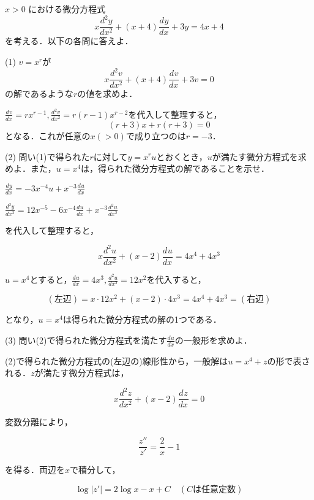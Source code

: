 \documentclass[a4j]{jarticle}
\let \ds \displaystyle
\newcommand{\idiff}[3]{
  \frac{d^{#1} #2}{d #3^{#1}}
}
\begin{document}
\section{}

\begin{screen}
 $x>0$ における微分方程式
 $$x\idiff{2}{y}{x}+(x+4)\idiff{}{y}{x}+3y = 4x+4$$
 を考える．以下の各問に答えよ．
\end{screen}

\begin{screen}
 (1) $v=x^r$が
 $$x\idiff{2}{v}{x}+(x+4)\idiff{}{v}{x}+3v=0$$
 の解であるような$r$の値を求めよ．
\end{screen}

$\ds \idiff{}{v}{x}=rx^{r-1},\idiff{2}{v}{x}=r(r-1)x^{r-2}$を代入して整理すると，
$$(r+3)x+r(r+3)=0$$となる．これが任意の$x(>0)$で成り立つのは$r=-3$．

\begin{screen}
 (2) 問い(1)で得られた$r$に対して$y=x^ru$とおくとき，$u$が満たす微分方程式を求めよ．また，$u=x^4$は，得られた微分方程式の解であることを示せ．
\end{screen}

$ \ds \idiff{}{y}{x}=-3x^{-4}u + x^{-3}\idiff{}{u}{x} $

$\ds \idiff{2}{y}{x}=12x^{-5}-6x^{-4}\idiff{}{u}{x}+x^{-3}\idiff{2}{u}{x} $

を代入して整理すると，

$$x\idiff{2}{u}{x}+(x-2)\idiff{}{u}{x}=4x^4+4x^3$$

$u=x^4$とすると，$\ds \idiff{}{u}{x}=4x^3,\idiff{2}{u}{x}=12x^2$を代入すると，

$$(\mbox{左辺})=x\cdot 12x^2 +(x-2)\cdot 4x^3= 4x^4+4x^3 = (\mbox{右辺})$$

となり，$u=x^4$は得られた微分方程式の解の1つである．

\begin{screen}
 (3) 問い(2)で得られた微分方程式を満たす$\ds \idiff{}{u}{x}$の一般形を求めよ．
\end{screen}

(2)で得られた微分方程式の(左辺の)線形性から，一般解は$u=x^4+z$の形で表される．$z$が満たす微分方程式は，

$$x\idiff{2}{z}{x}+(x-2)\idiff{}{z}{x}=0$$

変数分離により，

$$\frac{z''}{z'}=\frac{2}{x}-1$$

を得る．両辺を$x$で積分して，

$$\log |z'| = 2\log x - x + C \quad(C\mbox{は任意定数})$$
\end{document}
